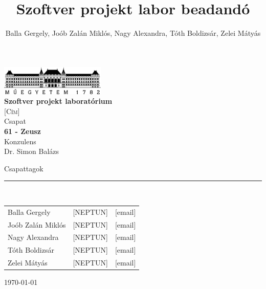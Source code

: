 \documentclass[12pt, a4paper]{book}
\title{Szoftver projekt labor beadandó}
\author{Balla Gergely, Joób Zalán Miklós, Nagy Alexandra, Tóth Boldizsár, Zelei Mátyás}
\begin{document}
\begin{titlepage} 
	\begin{center}
		\includegraphics[width=5cm]{img/BMElogo}\\ 
		\vspace{1cm}
		\LARGE{\bfseries{Szoftver projekt laboratórium}}\\
		\vspace{0.5cm}
		\Large\textsc{[Cím]}\\
		\vspace{1cm}
		\small{Csapat}\\
		\Large{\bfseries{61 - Zeusz}}\\
		\vspace{1cm}
		\small{Konzulens}\\
		\Large{Dr. Simon Balázs}
	\end{center}
	\begin{flushleft}
		\vspace*{6cm}
		Csapattagok\\
		\vspace{-0.3cm}
		\rule{14cm}{0.5pt}\\
		\vspace{0.2cm}
		\begin{tabular}{l l l} %
			Balla Gergely & [NEPTUN] & [email] \\
			Joób Zalán Miklós & [NEPTUN] & [email] \\
			Nagy Alexandra & [NEPTUN] & [email] \\
			Tóth Boldizsár  & [NEPTUN] & [email] \\
			Zelei Mátyás & [NEPTUN] & [email] \\
		\end{tabular}
	\end{flushleft}
	\begin{flushright}
		\vspace*{2cm}
		\today   %
	\end{flushright}
\end{titlepage}

\sloppy



\setcounter{chapter}{-1}
\end{document}
